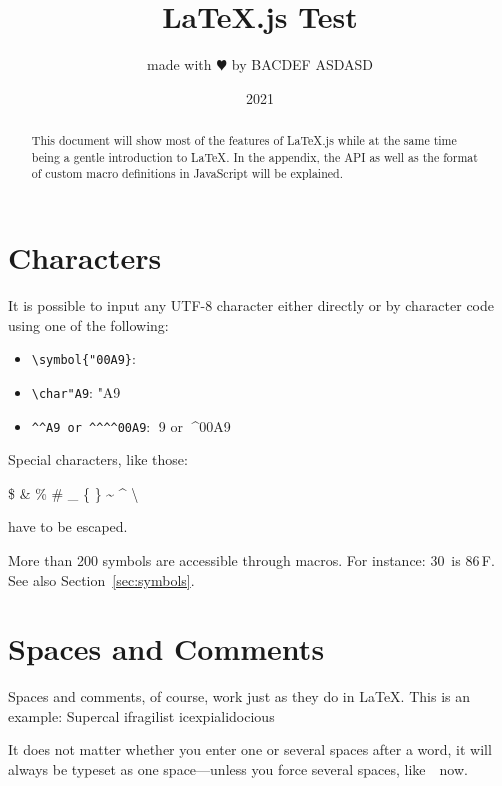 \documentclass{article}
\title{\LaTeX.js Test}
\author{made with $\varheartsuit$ by BACDEF ASDASD}
\date{2021}
\begin{document}
    \maketitle
    \begin{abstract}
        This document will show most of the features of \LaTeX.js while at the same time being a gentle introduction to \LaTeX.
        In the appendix, the API as well as the format of custom macro definitions in JavaScript will be explained.
    \end{abstract}


    \section{Characters}

    It is possible to input any UTF-8 character either directly or by character code
    using one of the following:

    \begin{itemize}
        \item \texttt{\textbackslash symbol\{"00A9\}}: 
        \item \verb|\char"A9|: \char"A9
        \item \verb|^^A9 or ^^^^00A9|: ^^A9 or ^^^^00A9
    \end{itemize}

    \bigskip

    \noindent
    Special characters, like those:
    \begin{center}
        \$ \& \% \# \_ \{ \} \~{} \^{} \textbackslash %
    \end{center}
%
    have to be escaped.

    More than 200 symbols are accessible through macros. For instance: 30\,\textcelsius{} is
    86\,\textdegree{}F. See also Section~\ref{sec:symbols}.


    \section{Spaces and Comments}

    Spaces and comments, of course, work just as they do in \LaTeX.
    This is an            %
    example: Supercal%
    ifragilist%
    icexpialidocious

    It does not matter whether you enter one or several spaces after a word, it
    will always be typeset as one space---unless you force several spaces, like\ \ now.
\end{document}
